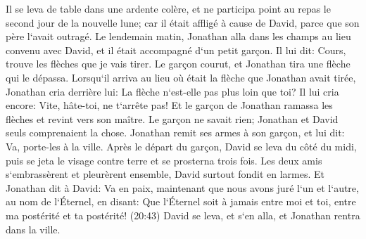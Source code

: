 \verse Il se leva de table dans une ardente colère, et ne participa point au repas le second jour de la nouvelle lune; car il était affligé à cause de David, parce que son père l`avait outragé. 
\verse Le lendemain matin, Jonathan alla dans les champs au lieu convenu avec David, et il était accompagné d`un petit garçon. 
\verse Il lui dit: Cours, trouve les flèches que je vais tirer. Le garçon courut, et Jonathan tira une flèche qui le dépassa. 
\verse Lorsqu`il arriva au lieu où était la flèche que Jonathan avait tirée, Jonathan cria derrière lui: La flèche n`est-elle pas plus loin que toi? 
\verse Il lui cria encore: Vite, hâte-toi, ne t`arrête pas! Et le garçon de Jonathan ramassa les flèches et revint vers son maître. 
\verse Le garçon ne savait rien; Jonathan et David seuls comprenaient la chose. 
\verse Jonathan remit ses armes à son garçon, et lui dit: Va, porte-les à la ville. 
\verse Après le départ du garçon, David se leva du côté du midi, puis se jeta le visage contre terre et se prosterna trois fois. Les deux amis s`embrassèrent et pleurèrent ensemble, David surtout fondit en larmes. 
\verse Et Jonathan dit à David: Va en paix, maintenant que nous avons juré l`un et l`autre, au nom de l`Éternel, en disant: Que l`Éternel soit à jamais entre moi et toi, entre ma postérité et ta postérité! (20:43) David se leva, et s`en alla, et Jonathan rentra dans la ville. 


